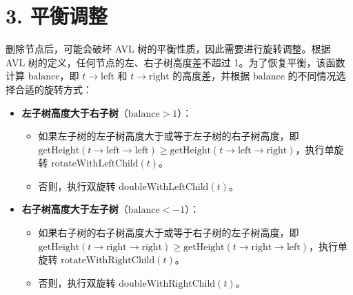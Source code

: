 \documentclass[UTF8]{ctexart}
\begin{document}
\section*{3. 平衡调整}
删除节点后，可能会破坏 AVL 树的平衡性质，因此需要进行旋转调整。根据 AVL 树的定义，任何节点的左、右子树高度差不超过 1。为了恢复平衡，该函数计算 $\text{balance}$，即 $t \rightarrow \text{left}$ 和 $t \rightarrow \text{right}$ 的高度差，并根据 $\text{balance}$ 的不同情况选择合适的旋转方式：
\begin{itemize}
    \item \textbf{左子树高度大于右子树}（$\text{balance} > 1$）：
    \begin{itemize}
        \item 如果左子树的左子树高度大于或等于左子树的右子树高度，即 $\text{getHeight}(t \rightarrow \text{left} \rightarrow \text{left}) \geq \text{getHeight}(t \rightarrow \text{left} \rightarrow \text{right})$，执行单旋转 $\text{rotateWithLeftChild}(t)$。
        \item 否则，执行双旋转 $\text{doubleWithLeftChild}(t)$。
    \end{itemize}
    
    \item \textbf{右子树高度大于左子树}（$\text{balance} < -1$）：
    \begin{itemize}
        \item 如果右子树的右子树高度大于或等于右子树的左子树高度，即 $\text{getHeight}(t \rightarrow \text{right} \rightarrow \text{right}) \geq \text{getHeight}(t \rightarrow \text{right} \rightarrow \text{left})$，执行单旋转 $\text{rotateWithRightChild}(t)$。
        \item 否则，执行双旋转 $\text{doubleWithRightChild}(t)$。
    \end{itemize}
\end{itemize}
\end{document}
